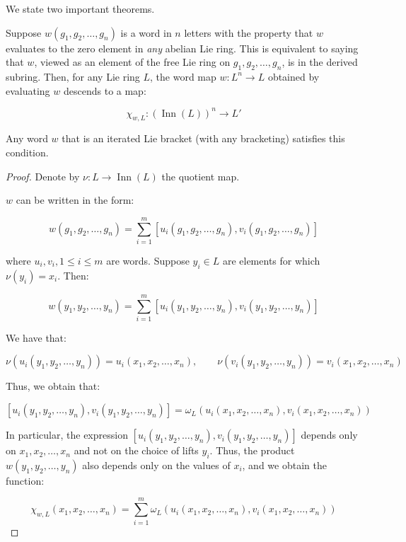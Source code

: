 \documentclass{ucetd}
\begin{document}
We state two important theorems.

\begin{theorem}\label{thm:iterated-bracket-descends-to-inn}
  Suppose $w(g_1,g_2,\dots,g_n)$ is a word in $n$ letters with the
  property that $w$ evaluates to the zero element in {\em any}
  abelian Lie ring. This is equivalent to saying that $w$, viewed as an
  element of the free Lie ring on $g_1,g_2,\dots,g_n$, is in the derived
  subring. Then, for any Lie ring $L$, the word map $w:L^n \to L$ obtained
  by evaluating $w$ descends to a map:

  $$\chi_{w,L}: (\operatorname{Inn}(L))^n  \to L'$$

  Any word $w$ that is an iterated Lie bracket (with any bracketing)
  satisfies this condition.
\end{theorem}

\begin{proof}
  Denote by $\nu:L \to \operatorname{Inn}(L)$ the quotient map.

  $w$ can be written in the form:

  $$w(g_1,g_2,\dots,g_n) = \sum_{i=1}^m [u_i(g_1,g_2,\dots,g_n),v_i(g_1,g_2,\dots,g_n)]$$

  where $u_i,v_i, 1 \le i \le m$ are words. Suppose $y_i \in L$ are
  elements for which $\nu(y_i) = x_i$. Then:

  $$w(y_1,y_2,\dots,y_n) = \sum_{i=1}^m [u_i(y_1,y_2,\dots,y_n),v_i(y_1,y_2,\dots,y_n)]$$

  We have that:

  $$\nu(u_i(y_1,y_2,\dots,y_n)) = u_i(x_1,x_2,\dots,x_n), \qquad \nu(v_i(y_1,y_2,\dots,y_n)) = v_i(x_1,x_2,\dots,x_n)$$

  Thus, we obtain that:

  $$[u_i(y_1,y_2,\dots,y_n),v_i(y_1,y_2,\dots,y_n)] = \omega_L(u_i(x_1,x_2,\dots,x_n),v_i(x_1,x_2,\dots,x_n))$$

  In particular, the expression
  $[u_i(y_1,y_2,\dots,y_n),v_i(y_1,y_2,\dots,y_n)]$ depends only on
  $x_1,x_2,\dots,x_n$ and not on the choice of lifts $y_i$. Thus, the
  product $w(y_1,y_2,\dots,y_n)$ also depends only on the values of
  $x_i$, and we obtain the function:

  $$\chi_{w,L}(x_1,x_2,\dots,x_n) = \sum_{i=1}^m \omega_L(u_i(x_1,x_2,\dots,x_n),v_i(x_1,x_2,\dots,x_n))$$
\end{proof}
\end{document}
